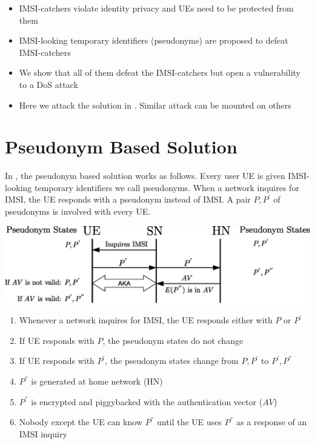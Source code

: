 \documentclass[portrait,a0]{a0poster}
\begin{document}
\begin{multicols}{2}
\begin{itemize}
\item IMSI-catchers violate identity privacy and UEs need to be protected from them
\item IMSI-looking temporary identifiers (pseudonyms) are proposed \cite{Ginzboorg_Niemi_2016,SSR15,Norrman_Naslund_Dubrova_2016,CCS15} to defeat IMSI-catchers
\item We show that all of them defeat the IMSI-catchers but open a vulnerability to a DoS attack
\item Here we attack the solution in \cite{CCS15}. Similar attack can be mounted on others
\end{itemize}


\section{Pseudonym Based Solution}
In \cite{CCS15}, the pseudonym based solution works as follows. Every user UE is given IMSI-looking temporary identifiers we call pseudonyms. When a network inquires for IMSI, the UE responds with a pseudonym instead of IMSI. A pair $P,P^{'}$ of pseudonyms is involved with every UE.

\begin{center}
\begin{minipage}[t]{0.9\linewidth} %
\vspace{.1cm} %
\includegraphics[width=1\linewidth]{ccs_solution.eps}
\hspace{0pt}
\vspace{.1cm}
\end{minipage}
\end{center}

\begin{enumerate}
\item Whenever a network inquires for IMSI, the UE responds either with $P$ or $P^{'}$
\item If UE responds with $P$, the pseudonym states do not change
\item \label{item:weakness} If UE responds with $P^{'}$, the pseudonym states change from $P,P^{'}$ to $P^{'},P^{''}$
\item $P^{''}$ is generated at home network (HN)
\item $P^{''}$ is encrypted and piggybacked with the authentication vector ($AV$)
\item Nobody except the UE can know $P^{''}$ until the UE uses $P^{''}$ as a response of an IMSI inquiry
\end{enumerate}


\end{multicols}
\end{document}
